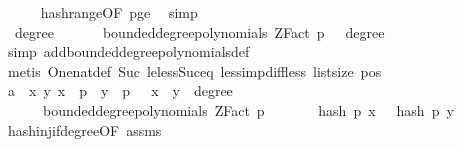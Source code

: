 \begin{isabellebody}
\ \ \ \ \isamarkupfalse%
\ hash{\isacharunderscore}{\kern0pt}range{\isacharbrackleft}{\kern0pt}OF\ p{\isacharunderscore}{\kern0pt}ge{\isacharunderscore}{\kern0pt}{}{\isacharbrackright}{\kern0pt}\ \isamarkupfalse%
\ simp\isanewline
\ \ \isamarkupfalse%
\ {\isachardoublequoteopen}{\isasymAnd}{\isasymomega}{\isachardot}{\kern0pt}\ degree\ {\isasymomega}\ {\isasymge}\ {}\ {\isasymLongrightarrow}\ {\isasymomega}\ {\isasymin}\ bounded{\isacharunderscore}{\kern0pt}degree{\isacharunderscore}{\kern0pt}polynomials\ {\isacharparenleft}{\kern0pt}ZFact\ p{\isacharparenright}{\kern0pt}\ {}\ {\isasymLongrightarrow}\ degree\ {\isasymomega}\ {\isacharequal}{\kern0pt}\ {}{\isachardoublequoteclose}\isanewline
\ \ \ \ \isamarkupfalse%
\ {\isacharparenleft}{\kern0pt}simp\ add{\isacharcolon}{\kern0pt}bounded{\isacharunderscore}{\kern0pt}degree{\isacharunderscore}{\kern0pt}polynomials{\isacharunderscore}{\kern0pt}def{\isacharparenright}{\kern0pt}\ \isanewline
\ \ \ \ \isamarkupfalse%
\ {\isacharparenleft}{\kern0pt}metis\ One{\isacharunderscore}{\kern0pt}nat{\isacharunderscore}{\kern0pt}def\ Suc{\isacharunderscore}{\kern0pt}{}\ le{\isacharunderscore}{\kern0pt}less{\isacharunderscore}{\kern0pt}Suc{\isacharunderscore}{\kern0pt}eq\ less{\isacharunderscore}{\kern0pt}imp{\isacharunderscore}{\kern0pt}diff{\isacharunderscore}{\kern0pt}less\ list{\isachardot}{\kern0pt}size{\isacharparenleft}{\kern0pt}{}{\isacharparenright}{\kern0pt}\ pos{}{\isacharparenright}{\kern0pt}\isanewline
\ \ \isamarkupfalse%
\ a{}{\isacharcolon}{\kern0pt}\ {\isachardoublequoteopen}{\isasymAnd}{\isasymomega}\ x\ y{\isachardot}{\kern0pt}\ x\ {\isacharless}{\kern0pt}\ p\ {\isasymLongrightarrow}\ y\ {\isacharless}{\kern0pt}\ p\ {\isasymLongrightarrow}\ \ x\ {\isasymnoteq}\ y\ {\isasymLongrightarrow}\ degree\ {\isasymomega}\ {\isasymge}\ {}\ {\isasymLongrightarrow}\ \isanewline
\ \ \ \ {\isasymomega}\ {\isasymin}\ bounded{\isacharunderscore}{\kern0pt}degree{\isacharunderscore}{\kern0pt}polynomials\ {\isacharparenleft}{\kern0pt}ZFact\ p{\isacharparenright}{\kern0pt}\ {}\ {\isasymLongrightarrow}\ \isanewline
\ \ \ \ hash\ p\ x\ {\isasymomega}\ {\isasymnoteq}\ hash\ p\ y\ {\isasymomega}{\isachardoublequoteclose}\ \isanewline
\ \ \ \ \isamarkupfalse%
\ hash{\isacharunderscore}{\kern0pt}inj{\isacharunderscore}{\kern0pt}if{\isacharunderscore}{\kern0pt}degree{\isacharunderscore}{\kern0pt}{}{\isacharbrackleft}{\kern0pt}OF\ assms{\isacharparenleft}{\kern0pt}{}{\isacharparenright}{\kern0pt}{\isacharbrackright}{\kern0pt}\ \isanewline

\end{isabellebody}
